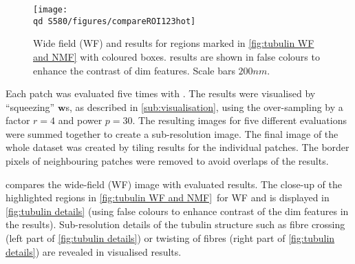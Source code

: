 \begin{figure}[!hb]
	\centering
	\texttt{[image: \\qd S580/figures/compareROI123hot]}
	\caption{Wide field (WF) and \inmf{} results for regions marked in \autoref{fig:tubulin WF and NMF} with coloured boxes. \inmf{} results are shown in false colours to enhance the contrast of dim features. Scale bars $200 \unit{nm}$.} 
	\label{fig:tubulin details}
\end{figure}
% 
Each patch was evaluated five times with \inmf{}. The results were visualised by ``squeezing'' $\bm{w}$s, as described in \autoref{sub:visualisation}, using the over-sampling by a factor $r=4$ and power $p=30$. The resulting images for five different \inmf{} evaluations were summed together to create a sub-resolution image. The final image of the whole dataset was created by tiling results for the individual patches. The border pixels of neighbouring patches were removed to avoid overlaps of the results.

 compares the wide-field (WF) image with \inmf{} evaluated results. The close-up of the highlighted regions in \autoref{fig:tubulin WF and NMF}\aaa\ for WF and \inmf{} is displayed in \autoref{fig:tubulin details} (using false colours to enhance contrast of the dim features in the \inmf{} results). Sub-resolution details of the tubulin structure such as fibre crossing (left part of \autoref{fig:tubulin details}) or twisting of fibres (right part of \autoref{fig:tubulin details}) are revealed in visualised \inmf{} results.



